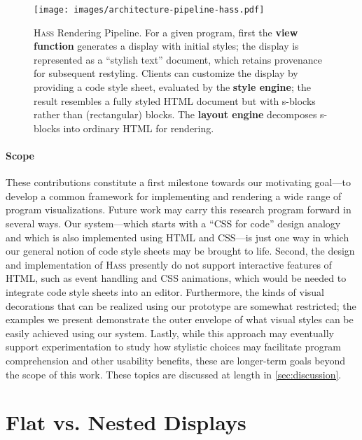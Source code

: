 \documentclass[acmsmall, screen]{acmart}
\newcommand{\parahead}[1]
  {\paragraph{\textbf{#1}}}
\newcommand{\hass}
{\textsc{Hass}}
\begin{document}
\begin{figure}[t]
  \texttt{[image: images/architecture-pipeline-hass.pdf]}
  \caption{
    \hass{} Rendering Pipeline.
For a given program, first the \textbf{view function}
    generates a display with initial styles; the display is represented as a
    ``stylish text'' document, which retains provenance for subsequent
    restyling.
    Clients can customize the display by providing a code style sheet,
    evaluated by the \textbf{style engine}; the result resembles
    a fully styled HTML document but with s-blocks rather than (rectangular)
    blocks.
    The \textbf{layout engine} decomposes s-blocks into
    ordinary HTML for rendering.
}
  \label{fig:architecture-hass}
\end{figure}
 













\parahead{Scope}

These contributions constitute a first milestone towards our motivating goal---to develop a common framework for implementing and rendering a wide range of program visualizations.
Future work may carry this research program forward in several ways.
Our system---which starts with a ``CSS for code'' design analogy and which is also implemented using HTML and CSS---is just one way in which our general notion of code style sheets may be brought to life.
Second, the design and implementation of \hass{} presently do not support interactive features of HTML, such as event handling and CSS animations, which would be needed to integrate code style sheets into an editor.
Furthermore, the kinds of visual decorations that can be realized using our prototype are somewhat restricted;
the examples we present demonstrate the outer envelope of what visual styles can be easily achieved using our system.
Lastly, while this approach may eventually support experimentation to study how stylistic choices may facilitate program comprehension and other usability benefits, these are longer-term goals beyond the scope of this work.
These topics are discussed at length in \autoref{sec:discussion}.  
\section{Flat vs. Nested Displays}
\label{sec:flat-nested}
\end{document}
